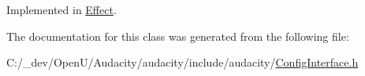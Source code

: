 Implemented in \hyperlink{class_effect_a04e1e2b42ba1095d79cfd4cdab9e6019}{Effect}.



The documentation for this class was generated from the following file\+:\begin{DoxyCompactItemize}
\item 
C\+:/\+\_\+dev/\+Open\+U/\+Audacity/audacity/include/audacity/\hyperlink{_config_interface_8h}{Config\+Interface.\+h}\end{DoxyCompactItemize}
